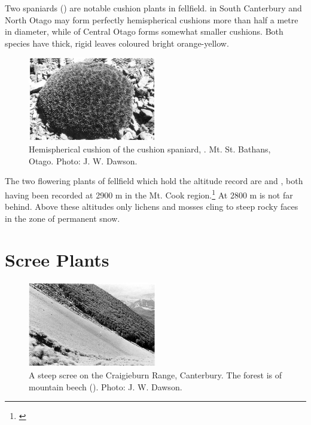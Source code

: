 Two spaniards () are notable cushion plants in fellfield.  in South Canterbury and North Otago may form perfectly hemispherical cushions more than half a metre in diameter, while  of Central Otago forms somewhat smaller cushions.
Both species have thick, rigid leaves coloured bright orange-yellow.

\begin{figure}
	\includegraphics[width=0.5\textwidth]{graphics/figure110cushion-spaniard.jpg}
	\centering
	\caption[Hemispherical cushion of the cushion spaniard]{Hemispherical cushion of the cushion spaniard, .
    Mt. St. Bathans, Otago.
	Photo: J. W. Dawson.}
	\label{fig:110cushion-spaniard}
\end{figure}

The two flowering plants of fellfield which hold the altitude record are  and , both having been recorded at 2900 m in the Mt.
Cook region.\footnote{\cite{wilson1978wild}}
At 2800 m  is not far behind.
Above these altitudes only lichens and mosses cling to steep rocky faces in the zone of permanent snow.

\section{Scree Plants}

\begin{figure}
	\includegraphics[width=0.5\textwidth]{graphics/figure111craigieburn.jpg}
	\centering
	\caption[A steep scree on the Craigieburn Range]{A steep scree on the Craigieburn Range, Canterbury.
    The forest is of mountain beech ().
	Photo: J. W. Dawson.}
	\label{fig:111craigieburn}
\end{figure}

